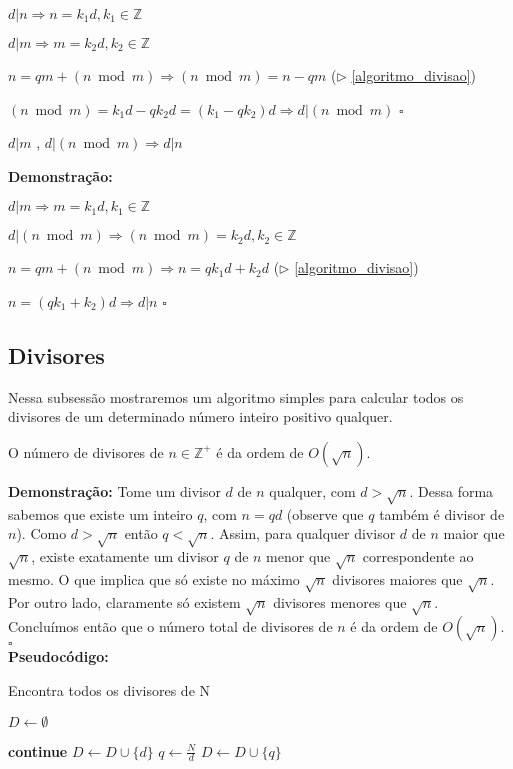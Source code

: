 $d|n \Rightarrow n = k_1d, k_1 \in \mathbb{Z}$

$d|m \Rightarrow m = k_2d, k_2 \in \mathbb{Z}$

$n = qm + (n \bmod m) \Rightarrow (n \bmod m) = n - qm$ ($\triangleright$ \autoref{algoritmo_divisao})

$(n \bmod m) = k_1d - qk_2d = (k_1 - qk_2)d \Rightarrow d|(n \bmod m)$ $\square$


\begin{corollary}\label{divisibilidade_modular2}
$d|m$ , $d|(n \bmod m) \Rightarrow d|n$
\end{corollary}
\textbf{Demonstração:}

$d|m \Rightarrow m = k_1d, k_1 \in \mathbb{Z}$

$d|(n \bmod m) \Rightarrow (n \bmod m) = k_2d, k_2 \in \mathbb{Z}$

$n = qm + (n \bmod m) \Rightarrow n = qk_1d + k_2d$ ($\triangleright$ \autoref{algoritmo_divisao})

$n = (qk_1 + k_2)d \Rightarrow d|n$ $\square$


\subsection{Divisores}
Nessa subsessão mostraremos um algoritmo simples para calcular todos os divisores de um determinado número inteiro positivo qualquer.

\begin{theorem} 
O número de divisores de $n \in \mathbb{Z}^{+}$ é da ordem de $O(\sqrt{n})$.
\end{theorem}
\textbf{Demonstração:}
Tome um divisor $d$ de $n$ qualquer, com $d > \sqrt{n}$. Dessa forma sabemos que existe um inteiro $q$, com $n=qd$ (observe que $q$ também é divisor de $n$). 
Como $d > \sqrt{n}$ então $q < \sqrt{n}$. Assim, para qualquer divisor $d$ de $n$ maior que $\sqrt{n}$, existe exatamente um divisor $q$ de $n$ menor que $\sqrt{n}$ correspondente ao mesmo.
O que implica que só existe no máximo $\sqrt{n}$ divisores maiores que $\sqrt{n}$. Por outro lado, claramente só existem $\sqrt{n}$ divisores menores que $\sqrt{n}$.
Concluímos então que o número total de divisores de $n$ é da ordem de $O(\sqrt{n})$. $\square$
\\

\textbf{Pseudocódigo:}
\begin{algorithm}
\caption{Encontra todos os divisores de N}\label{encontra_divisores}
\begin{algorithmic}[1]
\State $D \gets \emptyset$ 


\State \textbf{continue}
\EndIf
\State $D \gets D \cup \{d\}$
\State $q \gets \frac{N}{d}$
\State $D \gets D \cup \{q\}$
\EndIf

\EndFor

\State {}
\EndProcedure
\end{algorithmic}
\end{algorithm}

